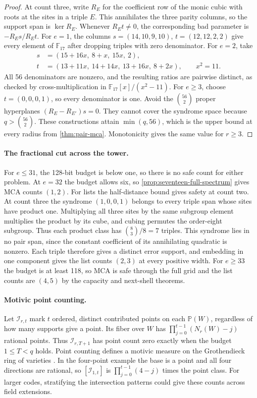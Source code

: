 \begin{proof}
At count three, write \(R_E\) for the coefficient row of the monic
cubic with roots at the sites in a triple \(E\). This annihilates the
three parity columns, so the support span is \(\ker R_E\). Whenever
\(R_Et\ne0\), the corresponding bad parameter is \(-R_Es/R_Et\).
For \(e=1\), the columns \(s=(14,10,9,10)\), \(t=(12,12,2,2)\)
give every element of \(\mathbb F_{17}\) after dropping triples with
zero denominator. For \(e=2\), take
\begin{align*}
 s&=(15+16x,\ 8+x,\ 15x,\ 2),\\
 t&=(13+11x,\ 14+14x,\ 13+16x,\ 8+2x),\qquad x^2=11.
\end{align*}
All 56 denominators are nonzero, and the resulting ratios are pairwise
distinct, as checked by cross-multiplication in \(\mathbb F_{17}[x]/(x^2-11)\).
For \(e\ge3\), choose \(t=(0,0,0,1)\), so every denominator is one.
Avoid the \(\binom{56}{2}\) proper hyperplanes \((R_E-R_{E'})s=0\).
They cannot cover the syndrome space because \(q>\binom{56}{2}\).
These constructions attain \(\min(q,56)\), which is the upper bound
at every radius from \cref{thm:pair-mca}. Monotonicity gives the same
value for \(r\ge3\).
\end{proof}

\paragraph{The fractional cut across the tower.}
For \(e\le31\), the 128-bit budget is below one, so there is no safe
count for either problem. At \(e=32\) the budget allows six, so
\cref{prop:seventeen-full-spectrum} gives MCA counts \((1,2)\).
For lists the half-distance bound gives safety at count two. At count
three the syndrome \((1,0,0,1)\) belongs to every triple span whose sites
have product one. Multiplying all three sites by the same subgroup
element multiplies the product by its cube, and cubing permutes the
order-eight subgroup. Thus each product class has \(\binom{8}{3}/8=7\)
triples. This syndrome lies in no pair span, since the constant coefficient of its annihilating
quadratic is nonzero. Each triple therefore gives a distinct error
support, and embedding in one component gives the list counts \((2,3)\)
at every positive width. For \(e\ge33\) the budget is at least 118,
so MCA is safe through the full grid and the list counts are \((4,5)\)
by the capacity and next-shell theorems.

\paragraph{Motivic point counting.}
Let \(\mathcal I_{r,t}\) mark \(t\) ordered, distinct contributed points
on each \(\mathbb P(W)\), regardless of how many supports give a point.
Its fiber over \(W\) has \(\prod_{j=0}^{t-1}(N_r(W)-j)\) rational points.
Thus \(\mathcal I_{r,T+1}\) has point count zero exactly when the budget
\(1\le T<q\) holds. Point counting defines a motivic measure on the
Grothendieck ring of varieties \cite{ellenbergLarsen2010counting}.
In the four-point example the base is a point and all four directions
are rational, so \([\mathcal I_{1,t}]\) is \(\prod_{j=0}^{t-1}(4-j)\)
times the point class. For larger codes, stratifying the intersection
patterns could give these counts across field extensions.

